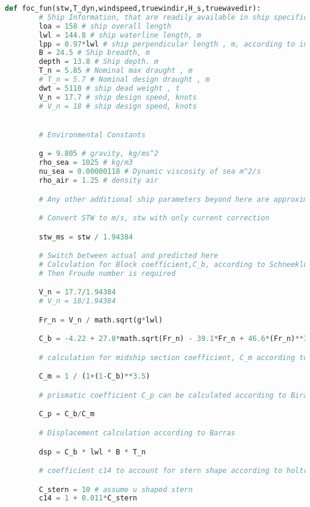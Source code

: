 \begin{lstlisting}[language=Python]
    def foc_fun(stw,T_dyn,windspeed,truewindir,H_s,truewavedir):
        # Ship Information, that are readily available in ship specification
        loa = 158 # ship overall length
        lwl = 144.8 # ship waterline length, m
        lpp = 0.97*lwl # ship perpendicular length , m, according to information
        B = 24.5 # Ship breadth, m
        depth = 13.8 # Ship depth. m
        T_n = 5.85 # Nominal max draught , m
        # T_n = 5.7 # Nominal design draught , m
        dwt = 5110 # ship dead weight , t
        V_n = 17.7 # ship design speed, knots
        # V_n = 18 # ship design speed, knots


        # Environmental Constants

        g = 9.805 # gravity, kg/ms^2 
        rho_sea = 1025 # kg/m3
        nu_sea = 0.00000118 # Dynamic viscosity of sea m^2/s
        rho_air = 1.25 # density air 

        # Any other additional ship parameters beyond here are approximated based on literature review.

        # Convert STW to m/s, stw with only current correction

        stw_ms = stw / 1.94384

        # Switch between actual and predicted here 
        # Calculation for Block coefficient,C_b, according to Schneekluth and Bertram 1998
        # Then Froude number is required

        V_n = 17.7/1.94384
        # V_n = 18/1.94384

        Fr_n = V_n / math.sqrt(g*lwl)

        C_b = -4.22 + 27.8*math.sqrt(Fr_n) - 39.1*Fr_n + 46.6*(Fr_n)**3

        # calculation for midship section coefficient, C_m according to Jensen from Birk

        C_m = 1 / (1+(1-C_b)**3.5)

        # prismatic coefficient C_p can be calculated according to Biran

        C_p = C_b/C_m 

        # Displacement calculation according to Barras 

        dsp = C_b * lwl * B * T_n

        # coefficient c14 to account for stern shape according to holtrop mennen

        C_stern = 10 # assume u shaped stern
        c14 = 1 + 0.011*C_stern 
        

\end{lstlisting}
